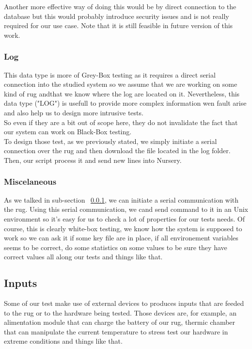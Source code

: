 \documentclass[12pt]{article}
\begin{document}
Another more effective way of doing this would be by direct connection to the database but this would probably introduce security issues and is not really required for our use case. Note that it is still feasible in future version of this work.

\subsubsection{Log}
\label{subsec:log}

This data type is more of Grey-Box testing as it requires a direct serial connection into the studied system so we assume that we  are working on some kind of \gls{rug} andthat we know where the log are located on it. Nevertheless, this data type ("LOG") is usefull to provide more complex information wen fault arise and also help us to design more intrusive tests.\\

So even if they are a bit out of scope here, they do not invalidate the fact that our system can work on Black-Box testing.\\

To design those test, as we previously stated, we simply initiate a serial connection over the \gls{rug} and then download the file located in the log folder. Then, our script process it and send new lines into Nursery.

\subsubsection{Miscelaneous}
\label{subsec:misc}

As we talked in sub-section ~\ref{subsec:log}, we can initiate a serial communication with the \gls{rug}. Using this serial communication, we cand send command to it in an Unix environment so it's easy for us to check a lot of properties for our tests needs. Of course, this is clearly white-box testing, we know how the system is supposed to work so we can ask it if some key file are in place, if all environement variables seems to be correct, do some statistics on some values to be sure they have correct values all along our tests and things like that.\\

\subsection{Inputs}

Some of our test make use of external devices to produces inputs that are feeded to the \gls{rug} or to the hardware being tested. Those devices are, for example, an alimentation module that can charge the battery of our \gls{rug}, thermic chamber that can manipulate the current temperature to stress test our hardware in extreme conditions and things like that.\\
\end{document}
